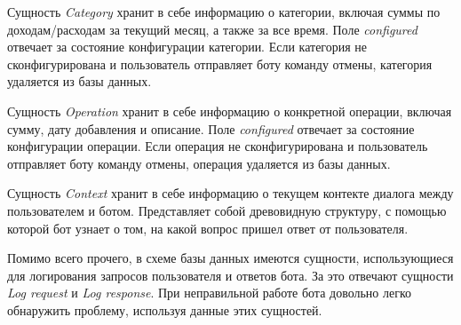 Сущность \emph{Category} хранит в себе информацию о категории, включая суммы по доходам/расходам за текущий месяц, а также за все время. Поле \emph{configured} отвечает за состояние конфигурации категории. Если категория не сконфигурирована и пользователь отправляет боту команду отмены, категория удаляется из базы данных.

Сущность \emph{Operation} хранит в себе информацию о конкретной операции, включая сумму, дату добавления и описание. Поле \emph{configured} отвечает за состояние конфигурации операции. Если операция не сконфигурирована и пользователь отправляет боту команду отмены, операция удаляется из базы данных.

Сущность \emph{Context} хранит в себе информацию о текущем контекте диалога между пользователем и ботом. Представляет собой древовидную структуру, с помощью которой бот узнает о том, на какой вопрос пришел ответ от пользователя.

Помимо всего прочего, в схеме базы данных имеются сущности, использующиеся для логирования запросов пользователя и ответов бота. За это отвечают сущности \emph{Log request} и \emph{Log response}. При неправильной работе бота довольно легко обнаружить проблему, используя данные этих сущностей.